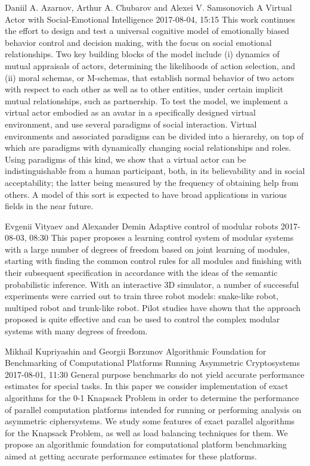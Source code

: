 \documentclass[10pt,fleqn,openany]{book} %
\begin{document}
\begin{enumerate}
	
	\paperabstract
	{Daniil A. Azarnov, Arthur A. Chubarov and Alexei V. Samsonovich}
	{A Virtual Actor with Social-Emotional Intelligence}
	{2017-08-04, 15:15}
	{This work continues the effort to design and test a universal cognitive model of emotionally biased behavior control and decision making, with the focus on social emotional relationships. Two key building blocks of the model include (i) dynamics of mutual appraisals of actors, determining the likelihoods of action selection, and (ii) moral schemas, or M-schemas, that establish normal behavior of two actors with respect to each other as well as to other entities, under certain implicit mutual relationships, such as partnership. To test the model, we implement a virtual actor embodied as an avatar in a specifically designed virtual environment, and use several paradigms of social interaction. Virtual environments and associated paradigms can be divided into a hierarchy, on top of which are paradigms with dynamically changing social relationships and roles. Using paradigms of this kind, we show that a virtual actor can be indistinguishable from a human participant, both, in its believability and in social acceptability; the latter being measured by the frequency of obtaining help from others. A model of this sort is expected to have broad applications in various fields in the near future.}
	
	
	\paperabstract
	{Evgenii Vityaev and Alexander Demin}
	{Adaptive control of modular robots}
	{2017-08-03, 08:30}
	{This paper proposes a learning control system of modular systems with a large number of degrees of freedom based on joint learning of modules, starting with finding the common control rules for all modules and finishing with their subsequent specification in accordance with the ideas of the semantic probabilistic inference. With an interactive 3D simulator, a number of successful experiments were carried out to train three robot models: snake-like robot, multiped robot and trunk-like robot. Pilot studies have shown that the approach proposed is quite effective and can be used to control the complex modular systems with many degrees of freedom.}
	
	
	\paperabstract
	{Mikhail Kupriyashin and Georgii Borzunov}
	{Algorithmic Foundation for Benchmarking of Computational Platforms Running Asymmetric Cryptosystems}
	{2017-08-01, 11:30}
	{General purpose benchmarks do not yield accurate performance estimates for special tasks. In this paper we consider implementation of exact algorithms for the 0-1 Knapsack Problem in order to determine the performance of parallel computation platforms intended for running or performing analysis on asymmetric ciphersystems. We study some features of exact parallel algorithms for the Knapsack Problem, as well as load balancing techniques for them. We propose an algorithmic foundation for computational platform benchmarking aimed at getting accurate performance estimates for these platforms.}
	

\end{enumerate}
\end{document}
